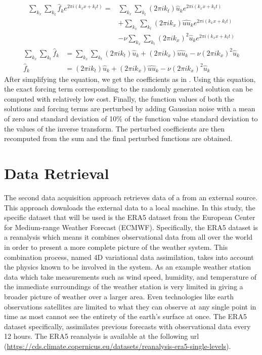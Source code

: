 \begin{equation}
  \begin{split}
    \sum_{k_{x}} \sum_{k_{t}} \hat{f}_k e^{2\pi i(k_{x}x+k_{t}t)} =
    & \sum_{k_{x}} \sum_{k_{t}} (2\pi i k_{t}) \hat{u}_k e^{2\pi i(k_{x}x+k_{t}t)} \\
    & + \sum_{k_{x}} \sum_{k_{t}} (2\pi i k_{x})\hat{uu}_k e^{2\pi i(k_{x}x+k_{t}t)} \\
    & - \nu\sum_{k_{x}} \sum_{k_{t}} (2\pi i k_{x})^2\hat{u}_k e^{2\pi i(k_{x}x+k_{t}t)} \label{eq:forced_viscous_burgers_fourier_substitution}
  \end{split}
\end{equation}
\begin{align}
  \sum_{k_{x}} \sum_{k_{t}} \hat{f}_k & = \sum_{k_{x}} \sum_{k_{t}} (2\pi i k_{t}) \hat{u}_k + (2\pi i k_{x})\hat{uu}_k - \nu(2\pi i k_{x})^2\hat{u}_k \label{eq:forced_viscous_burgers_fourier} \\
  \hat{f}_k & = (2\pi i k_{t}) \hat{u}_k + (2\pi i k_{x})\hat{uu}_k - \nu(2\pi i k_{x})^2\hat{u}_k \label{eq:forced_viscous_burgers_coeff}
\end{align}
After simplifying the equation, we get the coefficients as in . Using this equation, the exact forcing term corresponding to the randomly generated solution can be computed with relatively low cost. Finally, the function values of both the solutions and forcing terms are perturbed by adding Gaussian noise with a mean of zero and standard deviation of 10\% of the function value standard deviation to the values of the inverse transform. The perturbed coefficients are then recomputed from the sum and the final perturbed functions are obtained.

\section{Data Retrieval}\label{sec:data_retrieval}
\noindent The second data acquisition approach retrieves data of a from an external source. This approach downloads the external data to a local machine. In this study, the specific dataset that will be used is the ERA5 dataset from the European Center for Medium-range Weather Forecast (ECMWF). Specifically, the ERA5 dataset is a reanalysis which means it combines observational data from all over the world in order to present a more complete picture of the weather system. This combination process, named 4D variational data assimilation, takes into account the physics known to be involved in the system. As an example weather station data which take measurements such as wind speed, humidity, and temperature of the immediate surroundings of the weather station is very limited in giving a broader picture of weather over a larger area. Even technologies like earth observations satellites are limited to what they can observe at any single point in time as most cannot see the entirety of the earth's surface at once. The ERA5 dataset specifically, assimilates previous forecasts with observational data every 12 hours. The ERA5 reanalysis is available at the following url (\url{https://cds.climate.copernicus.eu/datasets/reanalysis-era5-single-levels}).

